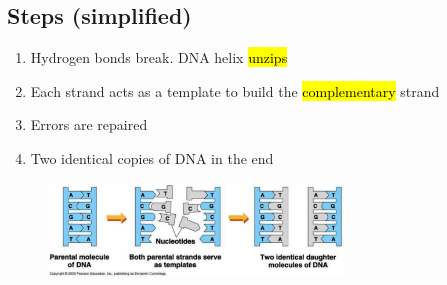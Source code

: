 \documentclass[a4paper,12pt]{article}
\begin{document}
\subsection{Steps (simplified)}
\begin{enumerate}
    \item{Hydrogen bonds break. DNA helix \hl{unzips}}
    \item{Each strand acts as a template to build the \hl{complementary} strand}
    \item{Errors are repaired}
    \item{Two identical copies of DNA in the end}
\end{enumerate}

\begin{figure}[H]
    \centering
    \includegraphics[width=0.7\textwidth]{replication}
\end{figure}
\end{document}
